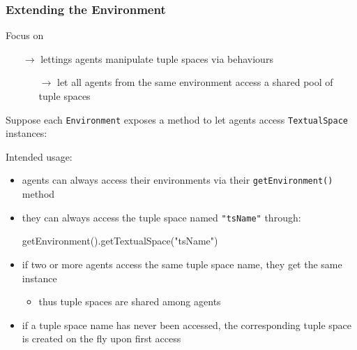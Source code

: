 \documentclass[presentation]{beamer}\mode<presentation>{\usetheme{AMSCesenaPurpleAndGold}}
\begin{document}
\begin{frame}[allowframebreaks]
	\frametitle{Extending the Environment}
	
	\begin{alertblock}{Focus on}
		\begin{itemize}
			\item[$\rightarrow$] lettings agents manipulate tuple spaces \alert{via behaviours}
			\begin{itemize}
				\item[$\rightarrow$] let all agents from the same environment access a \alert{shared} pool of tuple spaces
			\end{itemize}
		\end{itemize}
	\end{alertblock}

	\bigskip
	
	Suppose each \texttt{Environment} exposes a method to let agents access \texttt{TextualSpace} instances:
	
	
	Intended usage:
	\medskip
	\begin{itemize}
		\item agents can always access their environments via their \texttt{getEnvironment()} method
		
		\medskip
		
		\item they can always access the tuple space named \alert{\texttt{"tsName"}} through:
		\begin{center}\ttfamily
			getEnvironment().getTextualSpace(\alert{"tsName"})
		\end{center}
	
		\medskip
		
		\item if two or more agents access the same tuple space name, they get the \alert{same} instance
		\begin{itemize}
			\item thus tuple spaces are \alert{shared} among agents
		\end{itemize}
	
		\medskip
		
		\item if a tuple space name has never been accessed, the corresponding tuple space is created \alert{on the fly} upon first access
		
	\end{itemize}
	
\end{frame}
\end{document}
